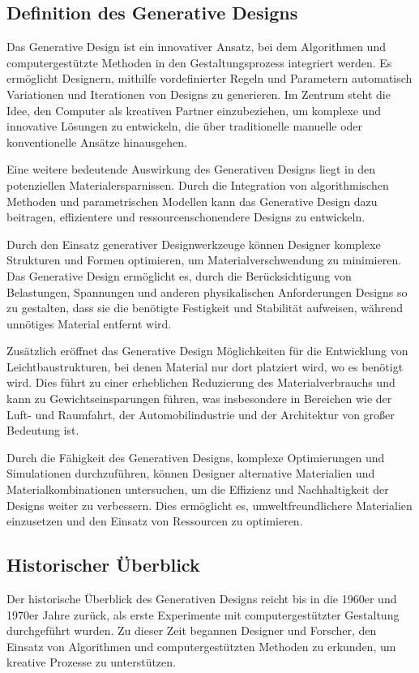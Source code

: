 \subsection*{Definition des Generative Designs}
Das Generative Design ist ein innovativer Ansatz, bei dem Algorithmen und computergestützte Methoden in den Gestaltungsprozess integriert werden. Es ermöglicht Designern, mithilfe vordefinierter Regeln und Parametern automatisch Variationen und Iterationen von Designs zu generieren. Im Zentrum steht die Idee, den Computer als kreativen Partner einzubeziehen, um komplexe und innovative Lösungen zu entwickeln, die über traditionelle manuelle oder konventionelle Ansätze hinausgehen.

Eine weitere bedeutende Auswirkung des Generativen Designs liegt in den potenziellen Materialersparnissen. Durch die Integration von algorithmischen Methoden und parametrischen Modellen kann das Generative Design dazu beitragen, effizientere und ressourcenschonendere Designs zu entwickeln.

Durch den Einsatz generativer Designwerkzeuge können Designer komplexe Strukturen und Formen optimieren, um Materialverschwendung zu minimieren. Das Generative Design ermöglicht es, durch die Berücksichtigung von Belastungen, Spannungen und anderen physikalischen Anforderungen Designs so zu gestalten, dass sie die benötigte Festigkeit und Stabilität aufweisen, während unnötiges Material entfernt wird.

Zusätzlich eröffnet das Generative Design Möglichkeiten für die Entwicklung von Leichtbaustrukturen, bei denen Material nur dort platziert wird, wo es benötigt wird. Dies führt zu einer erheblichen Reduzierung des Materialverbrauchs und kann zu Gewichtseinsparungen führen, was insbesondere in Bereichen wie der Luft- und Raumfahrt, der Automobilindustrie und der Architektur von großer Bedeutung ist.

Durch die Fähigkeit des Generativen Designs, komplexe Optimierungen und Simulationen durchzuführen, können Designer alternative Materialien und Materialkombinationen untersuchen, um die Effizienz und Nachhaltigkeit der Designs weiter zu verbessern. Dies ermöglicht es, umweltfreundlichere Materialien einzusetzen und den Einsatz von Ressourcen zu optimieren.


\subsection*{Historischer Überblick}

Der historische Überblick des Generativen Designs reicht bis in die 1960er und 1970er Jahre zurück, als erste Experimente mit computergestützter Gestaltung durchgeführt wurden. Zu dieser Zeit begannen Designer und Forscher, den Einsatz von Algorithmen und computergestützten Methoden zu erkunden, um kreative Prozesse zu unterstützen.

